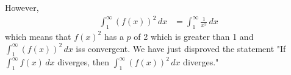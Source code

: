 \documentclass{article}
\begin{document}
\begin{enumerate}[label=\textbf{(6.\arabic*)}]
\begin{enumerate}
    However,
    \begin{align*}
        \int_1^\infty\!\left(f(x)\right)^2\,dx &= \int_1^\infty\!\frac{1}{x^2}\,dx
    \end{align*}
    which means that $f(x)^2$ has a $p$ of 2 which is greater than 1 and $\int_1^\infty\!\left(f(x)\right)^2\,dx$ iss convergent. We have just disproved the statement "If $\int_1^\infty\!f(x)\,dx$ diverges, then $\int_1^\infty\!\left(f(x)\right)^2\,dx$ diverges."
    \end{enumerate}



\end{enumerate}
\end{document}
